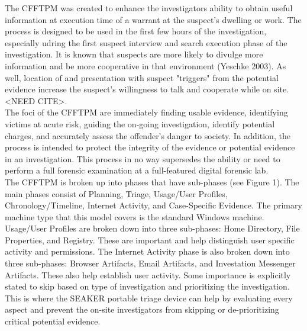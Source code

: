 \documentclass[12pt]{article}
\begin{document}
The CFFTPM was created to enhance the investigators ability to obtain useful information at execution time of a 
warrant at the suspect's dwelling or work.  The process is designed to be used in the first few hours of the 
investigation, especially udring the first suspect interview and search execution phase of the investigation.  It is
known that suspects are more likely to divulge more information and be more cooperative in that environment (Yeschke
2003\cite{yeschke2003art}).  As well, location of and presentation with suspect "triggers" from the potential evidence
increase the suspect's willingness to talk and cooperate while on site. <NEED CITE>.\\

The foci of the CFFTPM are immediately finding usable evidence, identifying victims at acute risk, guiding the
on-going investigation, identify potential charges, and accurately assess the offender's danger to society.  In
addition, the process is intended to protect the integrity of the evidence or potential evidence in an investigation.
This process in no way supersedes the ability or need to perform a full forensic examination at a full-featured
digital forensic lab.\\

The CFFTPM is broken up into phases that have sub-phases (see Figure 1).  The main phases consist of Planning, Triage, Usage/User
Profiles, Chronology/Timeline, Internet Activity, and Case-Specific Evidence.  The primary machine type that this model
covers is the standard Windows machine.  Usage/User Profiles are broken down into three sub-phases: Home Directory,
File Properties, and Registry.  These are important and help distinguish user specific activity and permissions.  The
Internet Activity phase is also broken down into three sub-phases: Browser Artifacts, Email Artifacts, and Investation
Messenger Artifacts.  These also help establish user activity.  Some importance is explicitly stated to skip based on
type of investigation and prioritizing the investigation.  This is where the SEAKER portable triage device can help by
evaluating every aspect and prevent the on-site investigators from skipping or de-prioritizing critical potential
evidence.\\
\end{document}
